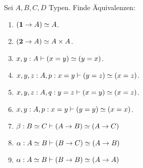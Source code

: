 \documentclass{uebung}
\begin{document}

\begin{exercise}[Äquivalenzen]
  Sei $A,B,C,D$ Typen.
  Finde Äquivalenzen:
  \begin{multicols}{2}
    \begin{enumerate}
      \item $(\mathbf{1} \to A)\simeq A$.
      \item $(\mathbf{2} \to A)\simeq A\times A$. 
      \item $x,y:A \vdash (x=y) \simeq (y=x)$.
      \item $x,y,z:A,p:x=y \vdash (y=z) \simeq (x=z)$.
      \item $x,y,z:A,q:y=z \vdash (x=y) \simeq (x=z)$.
      \item $x,y:A,p:x=y \vdash (y=y) \simeq (x=x)$.
      \item $\beta:B\simeq C\vdash (A\to B) \simeq (A\to C)$
      \item $\alpha:A\simeq B\vdash (B\to C) \simeq (A\to B)$
      \item $\alpha:A\simeq B\vdash (B\to B) \simeq (A\to A)$
    \end{enumerate}
  \end{multicols}
\end{exercise}
\end{document}
